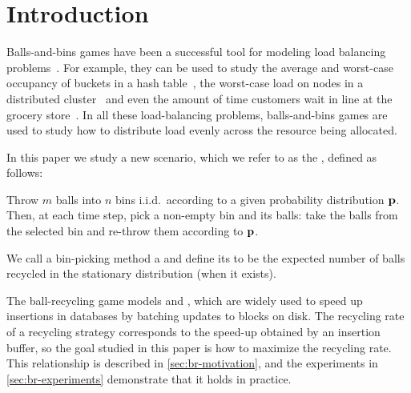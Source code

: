 
\section{Introduction}

Balls-and-bins games have been a successful tool for modeling load balancing
problems~\cite{DBLP:journals/tpds/Mitzenmacher01,DBLP:conf/stoc/AdlerCMR95,DBLP:conf/esa/AdlerBS98,DBLP:journals/siamcomp/AzarBKU99,DBLP:conf/random/ColeFMMRSU98,DBLP:conf/stoc/ColeMHMRSSV98,DBLP:journals/rsa/CzumajS01,DBLP:conf/focs/Mitzenmacher96,DBLP:journals/mst/Mitzenmacher99,DBLP:journals/jacm/Vocking03,DBLP:journals/rsa/BringmannSSS16,DBLP:journals/algorithmica/Park17,WestZaWa16,DBLP:journals/talg/Farach-ColtonFM09,DBLP:conf/icalp/ConwayFS18}.
For example, they can be used to study the average and worst-case occupancy of
buckets in a hash table~\cite{DBLP:journals/corr/abs-0901-1155}, the
worst-case load on nodes in a distributed
cluster~\cite{PetrovaOlMa10,DBLP:conf/podc/BerenbrinkFKMNW16} and even the amount
of time customers wait in line at the grocery store~\cite{DBLP:journals/mst/Mitzenmacher99}.  In
all these load-balancing problems, balls-and-bins games are used to study how
to distribute load evenly across the resource being allocated.

In this paper we study a new scenario, which we refer to as the
, defined as follows:
\begin{displayquote}
	Throw $m$ balls into $n$ bins i.i.d.\ according to a given probability
	distribution $\mathbf{p}$.  Then, at each time step, pick a non-empty bin and
	 its balls: take the balls from the selected bin and re-throw
	them according to $\mathbf{p}$.
\end{displayquote}
We call a bin-picking method a  and define its
 to be the expected number of balls recycled in the
stationary distribution (when it exists).

The ball-recycling game models  and , which are widely used to speed up insertions in databases by batching
updates to blocks on disk. The recycling rate of a recycling strategy
corresponds to the speed-up obtained by an insertion buffer, so the goal
studied in this paper is how to maximize the recycling rate. This relationship
is described in \cref{sec:br-motivation}, and the experiments in
\cref{sec:br-experiments} demonstrate that it holds in practice.

